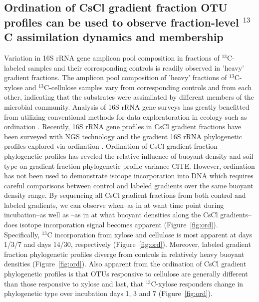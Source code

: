 \subsection{Ordination of CsCl gradient fraction OTU profiles can be used to
observe fraction-level $^{13}$C assimilation dynamics and membership}
Variation in 16S rRNA gene amplicon pool composition in fractions of
$^{13}$C-labeled samples and their corresponding controls is readily observed
in 'heavy' gradient fractions. The amplicon pool composition of 'heavy'
fractions of $^{13}$C-xylose and $^{13}$C-cellulose samples vary from
corresponding controls and from each other, indicating that the substrates were
assimilated by different members of the  microbial community.
Analysis of 16S rRNA gene surveys has greatly benefitted from utilizing
conventional methods for data exploratoration in ecology such as ordination \citep{Lozupone_2008}. 
Recently, 16S rRNA gene profiles in CsCl gradient fractions have been surveyed
with NGS technology and the gradient 16S rRNA 
phylogenetic profiles explored via ordination \citep{Angel_2013, Verastegui_2014}. Ordination of CsCl gradient fraction
phylogenetic profiles has reveled the relative influence of buoyant density and 
soil type on gradient fraction phylogenetic profile variance CITE. However, ordination
has not been used to demonstrate isotope incorporation into DNA which requires careful
comparisons between control and labeled gradients over the same buoyant density range. By
sequencing all CsCl gradient fractions from both control and labeled gradients, we can 
observe when--as in at want time point during incubation--as well as --as in
at what buoyant densities along the CsCl gradients--does isotope incorporation signal 
becomes apparent (Figure~\ref{fig:ord}). Specifically, $^{13}$C incorporation from xylose
and cellulose is most apparent at days 1/3/7 and days 14/30, respectively 
(Figure~\ref{fig:ord}). Moreover, labeled gradient fraction phylogenetic profiles diverge 
from controls in relatively heavy buoyant densities (Figure~\ref{fig:ord}). Also apparent
from the ordination of CsCl gradient phylogenetic profiles is that OTUs responsive to 
cellulose are generally different than those responsive to xylose and last,
that $^{13}$C-xylose responders change in phylogenetic type over incubation
days 1, 3 and 7 (Figure~\ref{fig:ord}).

